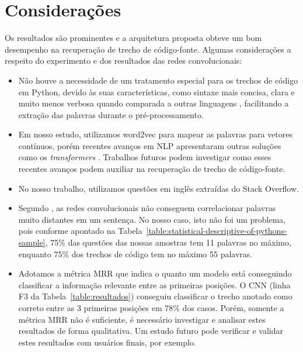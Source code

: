 \section{Considerações}
\label{sec:consideracoes-resultados}

Os resultados são prominentes e a arquitetura proposta obteve um bom desempenho na recuperação de trecho de código-fonte. Algumas considerações a respeito do experimento e dos resultados das redes convolucionais:

\begin{itemize}
    \item Não houve a necessidade de um tratamento especial para os trechos de código em Python, devido às suas características, como sintaxe mais concisa, clara e muito menos verbosa quando comparada a outras linguagens \citep{theodora-introductory-programming-python-2015}, facilitando a extração das palavras durante o pré-processamento. 
    
    \item Em nosso estudo, utilizamos \gls{word2vec} para mapear as palavras para vetores contínuos, porém recentes avanços em NLP apresentaram outras soluções como os \textit{transformers} \citep{attention-is-all-you-need-2017}. Trabalhos futuros podem investigar como esses recentes avanços podem auxiliar na recuperação de trecho de código-fonte.
    
    \item No nosso trabalho, utilizamos questões em inglês extraídas do Stack Overflow. 
    
    \item Segundo \cite{Goodfellow-et-al-2016}, as redes convolucionais não conseguem correlacionar palavras muito distantes em um sentença. No nosso caso, isto não foi um problema, pois conforme apontado na Tabela~\ref{table:statistical-descriptive-of-pythons-sample}, 75\% das questões das nossas amostras tem 11 palavras no máximo, enquanto 75\% dos trechos de código tem no máximo 55 palavras.
    
    \item Adotamos a métrica MRR que indica o quanto um modelo está conseguindo classificar a informação relevante entre as primeiras posições. O CNN (linha F3 da Tabela~\ref{table:resultados}) conseguiu classificar o trecho anotado como correto entre as 3 primeiras posições em 78\% dos casos. Porém, somente a métrica MRR não é suficiente, é necessário investigar e analisar estes resultados de forma qualitativa. Um estudo futuro pode verificar e validar estes resultados com usuários finais, por exemplo. 
\end{itemize}


